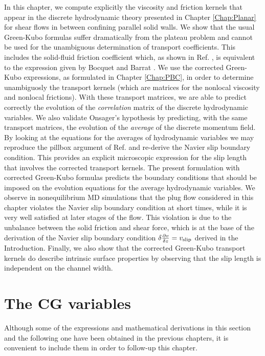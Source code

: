 \documentclass[b5paper,openright,10pt]{book}
\begin{document}
In this chapter, we compute explicitly the viscosity and friction kernels that appear in the discrete hydrodynamic theory presented in Chapter \ref{Chap:Planar} for shear flows in between confining parallel solid walls.  
We show  that  the  usual Green-Kubo  formulas  suffer
dramatically  from the  plateau problem  and  cannot be  used for  the
unambiguous  determination of  transport coefficients.   This includes
the solid-fluid friction coefficient which,  as shown in Ref. \cite{CamargoBC2018},
is  equivalent  to   the  expression  given  by   Bocquet  and  Barrat
\cite{Bocquet1994}.  We  use the corrected Green-Kubo  expressions, as
formulated in  Chapter \ref{Chap:PBC}, in  order to determine  unambiguosly the
transport kernels (which are matrices for the nonlocal viscosity and
nonlocal frictions).  With  these transport matrices, we  are able to
predict correctly the evolution  of the \textit{correlation} matrix of
the  discrete  hydrodynamic  variables.  We  also  validate  Onsager's
hypothesis  by  predicting,  with  the same  transport  matrices,  the
evolution of the \textit{average} of  the discrete momentum field.  By
looking at the equations for the averages of hydrodynamic variables we
may reproduce the pillbox argument of Ref.  \cite{CamargoBC2018} and re-derive the
Navier slip boundary condition.  This provides an explicit microscopic
expression for the  slip length that involves  the corrected transport
kernels.  The  present formulation with corrected  Green-Kubo formulas
predicts  the  boundary  conditions  that should  be  imposed  on  the
evolution equations for the average hydrodynamic variables. We observe
in nonequilibrium  MD simulations  that the  plug flow  considered in
this chapter violates the Navier slip boundary condition at short times,
while it is very  well  satisfied at  later stages  of  the flow.   This
violation is due to the unbalance between the solid friction and shear
force,  which is  at the  base of  the derivation  of the  Navier slip
boundary  condition $\delta\frac{\partial v}{\delta z}=v_{{\rm slip}}$ derived in the Introduction.   Finally, we  also show  that the
corrected Green-Kubo  transport kernels do describe  intrinsic surface
properties by  observing that  the slip length  is independent  on the
channel width.

\section{The CG variables}
\label{Sec:CGSlip}
Although some of the expressions and mathematical derivations in this section and the following one  have been obtained in the previous chapters, it is convenient to include them in order to follow-up this chapter.
\end{document}
